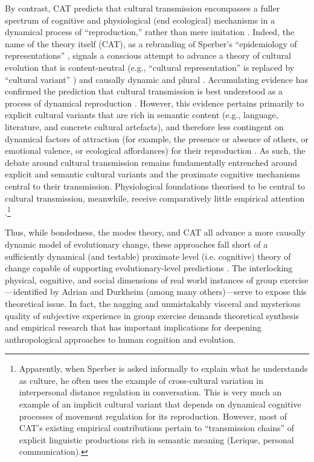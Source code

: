  By contrast, CAT  predicts that cultural transmission encompasses a fuller spectrum of cognitive and physiological (end ecological) mechanisms in a dynamical process of ``reproduction,'' rather than mere imitation \citep{Claidiere2007,Mesoudi2017}.  Indeed, the name of the theory itself (CAT), as a rebranding of Sperber's ``epidemiology of representations'' \citep{Sperber1996}, signals a conscious attempt to advance a theory of cultural evolution that is content-neutral (e.g., ``cultural representation'' is replaced by ``cultural variant'' \citep{Scott-Phillips2018}) and causally dynamic and plural \citep[``factors of attraction''][]{Claidiere2014}.  Accumulating evidence has confirmed the prediction that cultural transmission is best understood as a process of dynamical reproduction \citep[rather than strict preservative copying, see][]{Morin2016,Scott-Phillips2017}.  However, this evidence pertains primarily to explicit cultural variants that are rich in semantic content (e.g., language, literature, and concrete cultural artefacts), and therefore less contingent on dynamical factors of attraction (for example, the presence or absence of others, or emotional valence, or ecological affordances) for their reproduction \citep[15]{Ramstead2016}.  As such, the debate around cultural transmission remains fundamentally entrenched around explicit and semantic cultural variants and the proximate cognitive mechanisms central to their transmission.  Physiological foundations theorised to be central to cultural transmission, meanwhile, receive comparatively little empirical attention \citep{Ramstead2016,Lerique2016}.\footnote{Apparently, when Sperber is asked informally to explain what he understands as culture, he often uses the example of cross-cultural variation in interpersonal distance regulation in conversation.  This is very much an example of an implicit cultural variant that depends on dynamical cognitive processes of movement regulation for its reproduction.  However, most of CAT's existing empirical contributions pertain to ``transmission chains'' of explicit linguistic productions rich in semantic meaning (Lerique, personal communication).}

 Thus, while bondedness, the modes theory, and CAT all advance a more causally dynamic model of evolutionary change, these approaches fall short of a sufficiently dynamical (and testable) proximate level (i.e. cognitive) theory of change capable of supporting evolutionary-level predictions \citep{Badcock2012,Ramstead2017}.  The interlocking physical, cognitive, and social dimensions of real world instances of group exercise---identified by Adrian and Durkheim (among many others)---serve to expose this theoretical issue. In fact, the nagging and unmistakably visceral and mysterious quality of subjective experience in group exercise demands theoretical synthesis and empirical research that has important implications for deepening anthropological approaches to human cognition and evolution.

